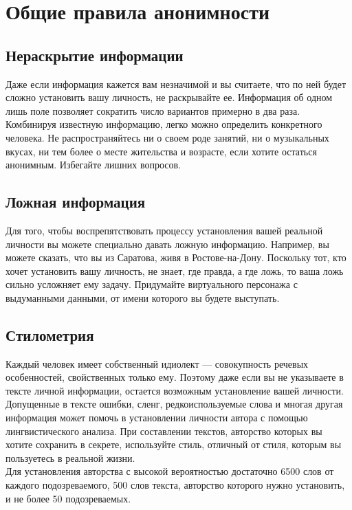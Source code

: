 \chapter{Общие правила анонимности}
\section{Нераскрытие информации}
Даже если информация кажется вам незначимой и вы считаете, что по ней будет сложно установить вашу личность, не раскрывайте ее. Информация об одном лишь поле позволяет сократить число вариантов примерно в два раза. Комбинируя известную информацию, легко можно определить конкретного человека. Не распространяйтесь ни о своем роде занятий, ни о музыкальных вкусах, ни тем более о месте жительства и возрасте, если хотите остаться анонимным. Избегайте лишних вопросов.
\section{Ложная информация}
Для того, чтобы воспрепятствовать процессу установления вашей реальной личности вы можете специально давать ложную информацию. Например, вы можете сказать, что вы из Саратова, живя в Ростове-на-Дону. Поскольку тот, кто хочет установить вашу личность, не знает, где правда, а где ложь, то ваша ложь сильно усложняет ему задачу. Придумайте виртуального персонажа с выдуманными данными, от имени которого вы будете выступать.
\section{Стилометрия}
Каждый человек имеет собственный идиолект --- совокупность речевых особенностей, свойственных только ему. Поэтому даже если вы не указываете в тексте личной информации, остается возможным установление вашей личности. Допущенные в тексте ошибки, сленг, редкоиспользуемые слова и многая другая информация может помочь в установлении личности автора с помощью лингвистического анализа. При составлении текстов, авторство которых вы хотите сохранить в секрете, используйте стиль, отличный от стиля, которым вы пользуетесь в реальной жизни.\\
Для установления авторства с высокой вероятностью достаточно 6500 слов от каждого подозреваемого, 500 слов текста, авторство которого нужно установить, и не более 50 подозреваемых\cite{stylo}.
